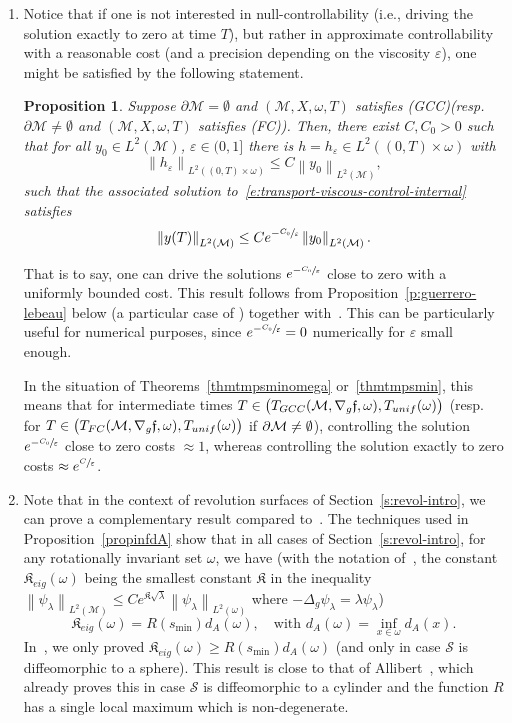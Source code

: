 \documentclass[11pt]{article}
\newcommand{\ie}{i.e.,\xspace}
\newcommand{\resp}{resp.\xspace}
\numberwithin{equation}{section}
\newcommand{\FC}{\textup{FC}}
\newcommand{\pFC}{\textup{(FC)}\xspace}
\newcommand{\GCC}{\textup{GCC}}
\newcommand{\pGCC}{\textup{(GCC)}\xspace}
\newcommand{\unif}{\textup{unif}}
\newtheorem{proposition}[lemma]{Proposition}
\theoremstyle{definition}
\newcommand{\M}{\ensuremath{\mathcal M}}
\newcommand{\calS}{\ensuremath{\mathcal S}}
\newcommand{\f}{\ensuremath{\mathfrak{f}}}
\newcommand\nor[2]{\left\|#1\right\|_{#2}}
\let\d\partial
\let\e\varepsilon
\let\eps\varepsilon
\begin{document}
\begin{enumerate}
\item Notice that if one is not interested in null-controllability (\ie driving the solution exactly to zero at time $T$), but rather in approximate controllability with a reasonable cost (and a precision depending on the viscosity $\eps$), one might be satisfied by the following statement.
\begin{proposition}
\label{p:guerrero-lebeau-control}
Suppose $\d\M= \emptyset$ and $(\M, X,\omega,T)$ satisfies \pGCC (resp.\ $\d\M \neq \emptyset$ and $(\M, X,\omega,T)$ satisfies \pFC). Then, there exist $C,C_0>0$ such that for all $y_0\in L^2(\M)$, $\eps \in (0,1]$ there is $h=h_\eps \in L^2((0,T)\times \omega)$ with
\[
\nor{h_\eps}{L^2((0,T)\times \omega)} \leq C \nor{y_0}{L^2(\M)},
\]
such that the associated solution to~\eqref{e:transport-viscous-control-internal} satisfies
\[
\nor{y(T)}{L^2(\M)} \leq Ce^{-\sfrac{C_{0}}{\e}} \nor{y_0}{L^2(\M)}.
\]
\end{proposition}
That is to say, one can drive the solutions $e^{-\sfrac{C_{0}}{\e}} $ close to zero with a uniformly bounded cost.
This result follows from Proposition~\ref{p:guerrero-lebeau} below (a particular case of \cite[Prop.\,3]{GL:07}) together with~\cite[App.]{LL:17approx}.
This can be particularly useful for numerical purposes, since $e^{-\sfrac{C_{0}}{\e}} = 0$ numerically for $\eps$ small enough.

In the situation of Theorems~\ref{thmtmpsminomega} or~\ref{thmtmpsmin}, this means that for intermediate times $T \in\nobreak \big(T_{\GCC}(\M, \nabla_g\f,\omega), T_{\unif}(\omega) \big)$ (\resp for $T \in \big(T_{\FC}(\M, \nabla_g\f,\omega), T_{\unif}(\omega) \big)$ if $\d\M \neq\nobreak \emptyset$), controlling the solution $e^{-\sfrac{C_{0}}{\e}}$ close to zero costs $\approx 1$, whereas controlling the solution exactly to zero costs $\approx e^{\sfrac{C}{\eps}}$.

\item Note that in the context of revolution surfaces of Section~\ref{s:revol-intro}, we can prove a complementary result compared to~\cite[Th.\,1.9/Cor.\,1.10]{LL:18}. The techniques used in Proposition~\ref{propinfdA} show that in all cases of Section~\ref{s:revol-intro}, for any rotationally invariant set $\omega$, we have (with the notation of~\cite{LL:18}, the constant $\mathfrak{K}_{eig}(\omega)$ being the smallest constant $\mathfrak{K}$ in the inequality $\nor{\psi_\lambda}{L^2(\M)} \leq Ce^{\mathfrak{K}\sqrt{\lambda}}\nor{\psi_\lambda}{L^2(\omega)}$ where $-\Delta_g \psi_\lambda = \lambda \psi_\lambda$)
\[
\mathfrak{K}_{eig}(\omega) = R(s_{\min}) d_A(\omega), \quad \text{with } d_A(\omega) = \inf_{x\in \omega} d_A(x).
\]
In~\cite{LL:18}, we only proved $\mathfrak{K}_{eig}(\omega) \geq R(s_{\min}) d_A(\omega)$ (and only in case $\calS$ is diffeomorphic to a sphere). This result is close to that of Allibert~\cite{Allibert:98}, which already proves this in case $\calS$ is diffeomorphic to a cylinder and the function $R$ has a single local maximum which is non-degenerate.
\end{enumerate}
\end{document}
